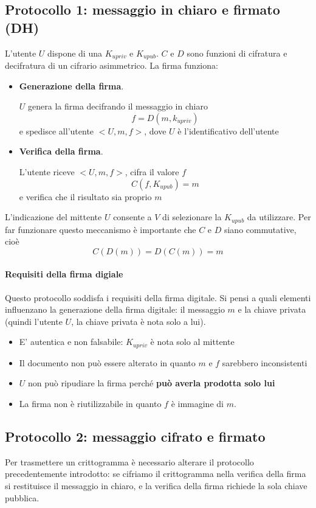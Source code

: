 \subsection{Protocollo 1: messaggio in chiaro e firmato (DH)}
L'utente $U$ dispone di una $K_{upriv}$ e $K_{upub}$. $C$ e $D$ sono funzioni di cifratura e decifratura di un cifrario asimmetrico.
La firma funziona:
\begin{itemize}
    \item \textbf{Generazione della firma}.
    
    $U$ genera la firma decifrando il messaggio in chiaro
    $$f = D(m, k_{upriv})$$
    e spedisce all'utente $<U,m,f>$, dove $U$ è l'identificativo dell'utente
    \item \textbf{Verifica della firma}.
    
    L'utente riceve $<U,m,f>$, cifra il valore $f$ 
    $$C(f, K_{upub}) = m$$
    e verifica che il risultato sia proprio $m$
\end{itemize}
L'indicazione del mittente $U$ consente a $V$ di selezionare la $K_{upub}$ da utilizzare. Per far funzionare questo meccanismo è importante che $C$ e $D$ siano commutative, cioè
$$C(D(m))=D(C(m))=m$$

\paragraph{Requisiti della firma digiale} Questo protocollo soddisfa i requisiti della firma digitale. Si pensi a quali elementi influenzano la generazione della firma digitale: il messaggio $m$ e la chiave privata (quindi l'utente $U$, la chiave privata è nota solo a lui). 
\begin{itemize}
    \item E' autentica e non falsabile: $K_{upriv}$  è nota solo al mittente
    \item Il documento non può essere alterato in quanto $m$ e $f$ sarebbero inconsistenti
    \item $U$ non può ripudiare la firma perché \textbf{può averla prodotta solo lui}
    \item La firma non è riutilizzabile in quanto $f$ è immagine di $m$.
\end{itemize}

\subsection{Protocollo 2: messaggio cifrato e firmato}
Per trasmettere un crittogramma è necessario alterare il protocollo precedentemente introdotto: se cifriamo il crittogramma nella verifica della firma si restituisce il messaggio in chiaro, e la verifica della firma richiede la sola chiave pubblica. 
